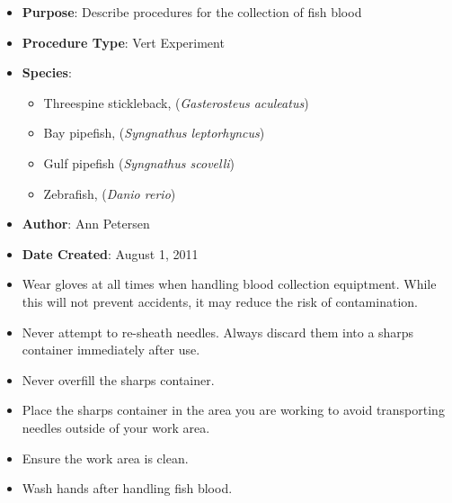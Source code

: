 \documentclass[
  letterpaper,
  DIV=11,
  numbers=noendperiod]{scrreprt}
\providecommand{\tightlist}{%
  \setlength{\itemsep}{0pt}\setlength{\parskip}{0pt}}\usepackage{longtable,booktabs,array}
\begin{document}
\begin{itemize}
\tightlist
\item
  \textbf{Purpose}: Describe procedures for the collection of fish blood
\item
  \textbf{Procedure Type}: Vert Experiment
\item
  \textbf{Species}:

  \begin{itemize}
  \tightlist
  \item
    Threespine stickleback, (\emph{Gasterosteus aculeatus})
  \item
    Bay pipefish, (\emph{Syngnathus leptorhyncus})
  \item
    Gulf pipefish (\emph{Syngnathus scovelli})
  \item
    Zebrafish, (\emph{Danio rerio})
  \end{itemize}
\item
  \textbf{Author}: Ann Petersen
\item
  \textbf{Date Created}: August 1, 2011
\end{itemize}

\begin{tcolorbox}[enhanced jigsaw, rightrule=.15mm, title=\textcolor{quarto-callout-warning-color}{\faExclamationTriangle}\hspace{0.5em}{HUMAN SAFETY MEASURES}, titlerule=0mm, opacitybacktitle=0.6, toprule=.15mm, bottomrule=.15mm, opacityback=0, left=2mm, colframe=quarto-callout-warning-color-frame, breakable, coltitle=black, colback=white, colbacktitle=quarto-callout-warning-color!10!white, bottomtitle=1mm, leftrule=.75mm, toptitle=1mm, arc=.35mm]

\begin{itemize}
\tightlist
\item
  Wear gloves at all times when handling blood collection equiptment.
  While this will not prevent accidents, it may reduce the risk of
  contamination.
\item
  Never attempt to re-sheath needles. Always discard them into a sharps
  container immediately after use.
\item
  Never overfill the sharps container.
\item
  Place the sharps container in the area you are working to avoid
  transporting needles outside of your work area.
\item
  Ensure the work area is clean.
\item
  Wash hands after handling fish blood.
\end{itemize}

\end{tcolorbox}
\end{document}
